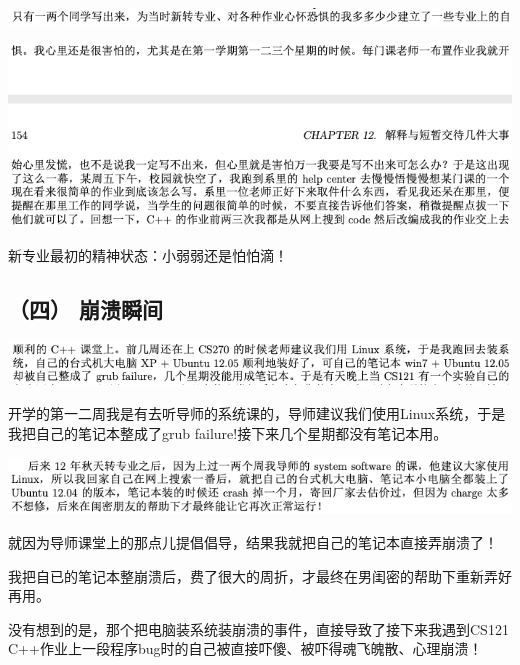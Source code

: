 \documentclass[9pt, b5paper]{article}
\begin{document}
\begin{center}
\includegraphics[width=.9\linewidth]{./pic/backups_plans_20210425_110847.png}
\end{center}

\begin{center}
\includegraphics[width=.9\linewidth]{./pic/backups_plans_20210425_112104.png}
\end{center}

新专业最初的精神状态：小弱弱还是怕怕滴！

\subsection{（四） 崩溃瞬间}
\label{sec:org981bf86}

\begin{center}
\includegraphics[width=.9\linewidth]{./pic/backups_plans_20210424_203440.png}
\end{center}

开学的第一二周我是有去听导师的系统课的，导师建议我们使用Linux系统，于是我把自己的笔记本整成了grub failure!接下来几个星期都没有笔记本用。

\begin{center}
\includegraphics[width=.9\linewidth]{./pic/backups_plans_20210425_125121.png}
\end{center}

就因为导师课堂上的那点儿提倡倡导，结果我就把自己的笔记本直接弄崩溃了！

我把自已的笔记本整崩溃后，费了很大的周折，才最终在男闺密的帮助下重新弄好再用。

没有想到的是，那个把电脑装系统装崩溃的事件，直接导致了接下来我遇到CS121 C++作业上一段程序bug时的自己被直接吓傻、被吓得魂飞魄散、心理崩溃！
\end{document}

